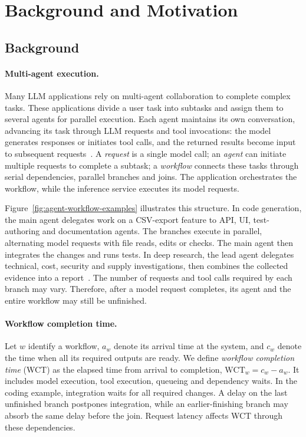 \section{Background and Motivation}
\label{sec:background-motivation}

\subsection{Background}
\label{sec:motivation-background}

\paragraph{Multi-agent execution.}
Many LLM applications rely on multi-agent collaboration to complete
complex tasks. These applications divide a user task into subtasks and
assign them to several agents for parallel execution. Each agent maintains
its own conversation, advancing its task through LLM requests and tool
invocations: the model generates responses or initiates tool calls, and
the returned results become input to subsequent
requests~\cite{wu2023autogen}. A \emph{request} is a single model call;
an \emph{agent} can initiate multiple requests to complete a subtask;
a \emph{workflow} connects these tasks through serial dependencies,
parallel branches and joins. The application orchestrates the workflow,
while the inference service executes its model requests.

Figure~\ref{fig:agent-workflow-examples} illustrates this structure.
In code generation, the main agent delegates work on a CSV-export feature
to API, UI, test-authoring and documentation agents. The branches execute
in parallel, alternating model requests with file reads, edits or checks.
The main agent then integrates the changes and runs tests. In deep
research, the lead agent delegates technical, cost, security and supply
investigations, then combines the collected evidence into a
report~\cite{anthropic2025multiagent}. The number of requests and tool
calls required by each branch may vary. Therefore, after a model request
completes, its agent and the entire workflow may still be unfinished.

\paragraph{Workflow completion time.}
Let $w$ identify a workflow, $a_w$ denote its arrival time at the system,
and $c_w$ denote the time when all its required outputs are ready.
We define \emph{workflow completion time} (WCT) as the elapsed time from
arrival to completion, $\mathrm{WCT}_w=c_w-a_w$.
It includes model execution, tool execution,
queueing and dependency waits. In the coding example, integration waits
for all required changes. A delay on the last unfinished branch postpones
integration, while an earlier-finishing branch may absorb the same delay
before the join. Request latency affects WCT through these dependencies.

